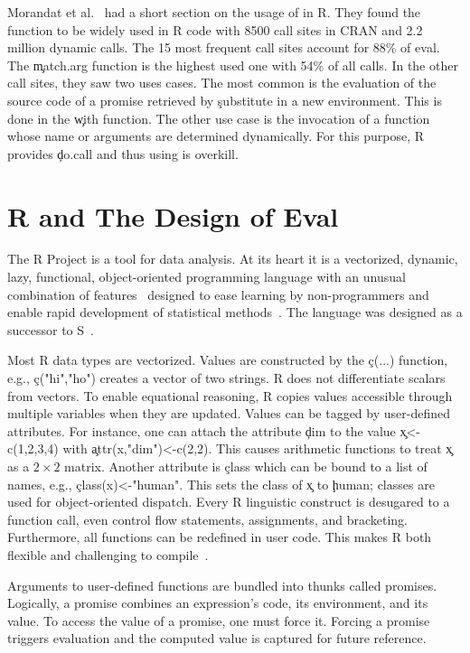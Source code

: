 \documentclass[conference]{IEEEtran}
\begin{document}
Morandat et al.~\cite{ecoop12} had a short section on the usage of \eval in
R. They found the \eval function to be widely used in R code with 8500 call
sites in CRAN and 2.2 million dynamic calls. The 15 most frequent call sites
account for 88\% of eval. The \c{match.arg} function is the highest used one
with 54\% of all calls. In the other call sites, they saw two uses
cases. The most common is the evaluation of the source code of a promise
retrieved by \c{substitute} in a new environment. This is done in the
\c{with} function. The other use case is the invocation of a function whose
name or arguments are determined dynamically. For this purpose, R provides
\c{do.call} and thus using \eval is overkill.

\section{R and The Design of Eval}

The R Project is a tool for data analysis.  At its heart it is a {vectorized,
  dynamic, lazy, functional, object-oriented} programming language with an
unusual combination of features~\cite{ecoop12} designed to ease learning by
non-programmers and enable rapid development of statistical
methods~\cite{R96}.  The language was designed as a successor to
S~\cite{S88}.



Most R data types are vectorized. Values are constructed by the \c{c(...)}
function, e.g., \c{c("hi","ho")} creates a vector of two strings.  R does
not differentiate scalars from vectors. To enable equational reasoning, R
copies values accessible through multiple variables when they are updated.
Values can be tagged by user-defined attributes. For instance, one can
attach the attribute \c{dim} to the value \c{x<-c(1,2,3,4)} with
\c{attr(x,"dim")<-c(2,2)}.  This causes arithmetic functions to treat \c x
as a $2 \times 2$ matrix. Another attribute is \c{class} which can be bound to a list
of names, e.g., \c{class(x)<-"human"}. This sets the class of \c{x} to
\c{human}; classes are used for object-oriented dispatch.  Every R
linguistic construct is desugared to a function call, even control flow
statements, assignments, and bracketing. Furthermore, all functions can be
redefined in user code. This makes R both flexible and challenging to
compile~\cite{dls19}.

Arguments to user-defined functions are bundled into thunks called
promises. Logically, a promise combines an expression's code, its
environment, and its value.  To access the value of a promise, one must
force it. Forcing a promise triggers evaluation and the computed value is
captured for future reference.
\end{document}
